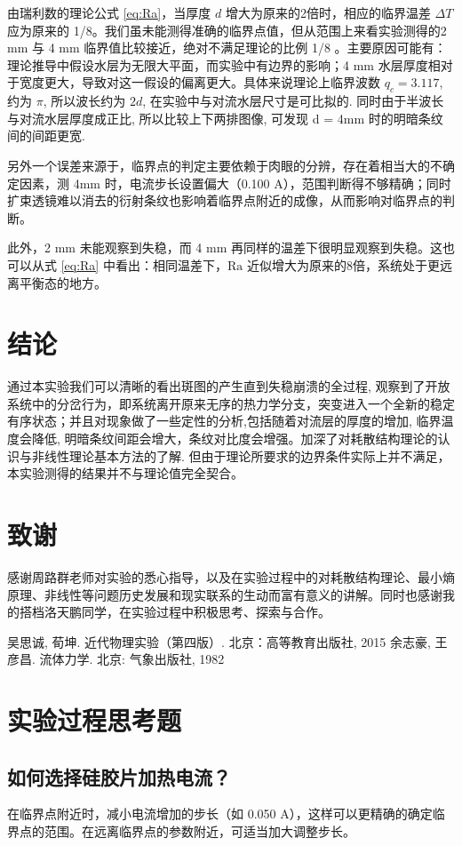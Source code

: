 \documentclass[aps,pre,12pt,preprint,onecolumn,showpacs,showkeys]{revtex4-1}
\begin{document}
	由瑞利数的理论公式 \ref{eq:Ra}，当厚度 $d$ 增大为原来的2倍时，相应的临界温差 $\Delta T$ 应为原来的 1/8。我们虽未能测得准确的临界点值，但从范围上来看实验测得的2 mm 与 4 mm 临界值比较接近，绝对不满足理论的比例 1/8 。主要原因可能有：理论推导中假设水层为无限大平面，而实验中有边界的影响；4 mm 水层厚度相对于宽度更大，导致对这一假设的偏离更大。具体来说理论上临界波数 $q_c = 3.117$, 约为 $\pi$, 所以波长约为 $2d$, 在实验中与对流水层尺寸是可比拟的. 同时由于半波长与对流水层厚度成正比, 所以比较上下两排图像, 可发现 d = 4mm 时的明暗条纹间的间距更宽.
	
	另外一个误差来源于，临界点的判定主要依赖于肉眼的分辨，存在着相当大的不确定因素，测 4mm 时，电流步长设置偏大（0.100 $\mathrm A$），范围判断得不够精确；同时扩束透镜难以消去的衍射条纹也影响着临界点附近的成像，从而影响对临界点的判断。
	
	此外，2 mm 未能观察到失稳，而 4 mm 再同样的温差下很明显观察到失稳。这也可以从式 \ref{eq:Ra} 中看出：相同温差下，$\mathrm{Ra}$ 近似增大为原来的8倍，系统处于更远离平衡态的地方。
	
\section{结论}
	通过本实验我们可以清晰的看出斑图的产生直到失稳崩溃的全过程, 观察到了开放系统中的分岔行为，即系统离开原来无序的热力学分支，突变进入一个全新的稳定有序状态；并且对现象做了一些定性的分析,包括随着对流层的厚度的增加, 临界温度会降低, 明暗条纹间距会增大，条纹对比度会增强。加深了对耗散结构理论的认识与非线性理论基本方法的了解. 但由于理论所要求的边界条件实际上并不满足，本实验测得的结果并不与理论值完全契合。

\section{致谢}
	感谢周路群老师对实验的悉心指导，以及在实验过程中的对耗散结构理论、最小熵原理、非线性等问题历史发展和现实联系的生动而富有意义的讲解。同时也感谢我的搭档洛天鹏同学，在实验过程中积极思考、探索与合作。
	
\begin{thebibliography}{}
 吴思诚, 荀坤. 近代物理实验（第四版）. 北京：高等教育出版社, 2015
 余志豪, 王彦昌. 流体力学. 北京: 气象出版社, 1982
\end{thebibliography}
\clearpage
\appendix
\section{实验过程思考题}
	\subsection{如何选择硅胶片加热电流？}
		在临界点附近时，减小电流增加的步长（如 0.050 A），这样可以更精确的确定临界点的范围。在远离临界点的参数附近，可适当加大调整步长。
	
\end{document}
